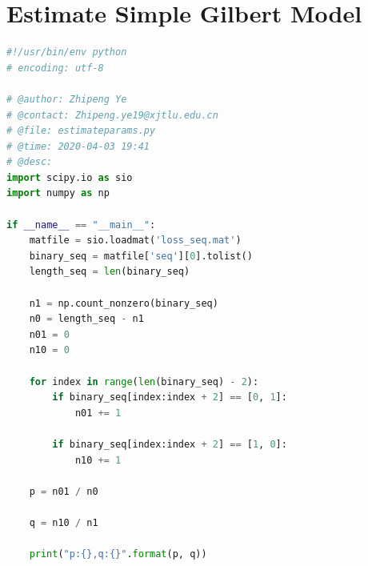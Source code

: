\documentclass[11pt]{article}
\begin{document}
\section{Estimate Simple Gilbert Model} \label{ESGM}
\begin{lstlisting}[language=Python]
#!/usr/bin/env python
# encoding: utf-8

# @author: Zhipeng Ye
# @contact: Zhipeng.ye19@xjtlu.edu.cn
# @file: estimateparams.py
# @time: 2020-04-03 19:41
# @desc:
import scipy.io as sio
import numpy as np

if __name__ == "__main__":
    matfile = sio.loadmat('loss_seq.mat')
    binary_seq = matfile['seq'][0].tolist()
    length_seq = len(binary_seq)

    n1 = np.count_nonzero(binary_seq)
    n0 = length_seq - n1
    n01 = 0
    n10 = 0

    for index in range(len(binary_seq) - 2):
        if binary_seq[index:index + 2] == [0, 1]:
            n01 += 1

        if binary_seq[index:index + 2] == [1, 0]:
            n10 += 1

    p = n01 / n0

    q = n10 / n1

    print("p:{},q:{}".format(p, q))

\end{lstlisting}
\end{document}
